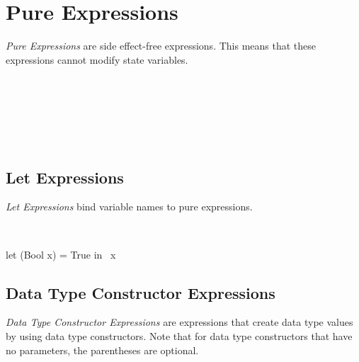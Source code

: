 \chapter{Pure Expressions}
\emph{Pure Expressions} are side effect-free expressions. This means
that these expressions cannot modify state variables.

\begin{abssyntax}
      {}
                {}
                {}
                {}
                {}
                {}
                {}
                {}
                {}
                {}
                {}
                \TRS{(}  \TRS{)}\\
     {}\\
  {}\ \ \\
      {}\\
  {}\ 
\end{abssyntax}


\section{Let Expressions}
\emph{Let Expressions} bind variable names to pure expressions.

\begin{abssyntax}
  {}\ \TRS{(}  \TRS{)}\ \TRS{=}\ \ \ 
\end{abssyntax}

\begin{absexample}
let (Bool x) = True in ~x  
\end{absexample}

\section{Data Type Constructor Expressions}
\emph{Data Type Constructor Expressions} are expressions that create data type values by using data type constructors.
Note that for data type constructors that have no parameters, the parentheses are optional.

\begin{abssyntax}
  {}
                    {}\ \TRS{(}  \TRS{)}
\end{abssyntax}

